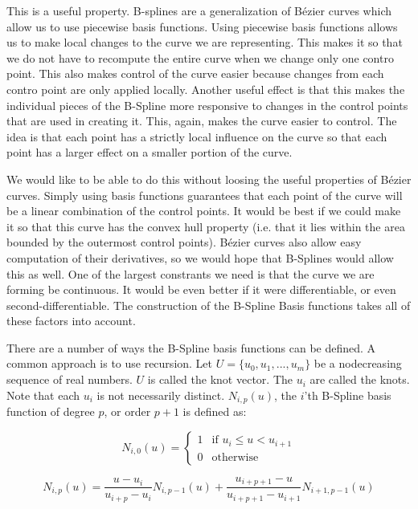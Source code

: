 This is a useful property.
B-splines are a generalization of B\'{e}zier curves which allow us to use piecewise basis functions.
Using piecewise basis functions allows us to make local changes to the curve we are representing.
This makes it so that we do not have to recompute the entire curve when we change only one contro point.
This also makes control of the curve easier because changes from each contro point are only applied locally.
Another useful effect is that this makes the individual pieces of the B-Spline more responsive to changes in the control points that are used in creating it.
This, again, makes the curve easier to control.
The idea is that each point has a strictly local influence on the curve so that each point has a larger effect on a smaller portion of the curve.

We would like to be able to do this without loosing the useful properties of B\'{e}zier curves.
Simply using basis functions guarantees that each point of the curve will be a linear combination of the control points.
It would be best if we could make it so that this curve has the convex hull property (i.e. that it lies within the area bounded by the outermost control points).
B\'{e}zier curves also allow easy computation of their derivatives, so we would hope that B-Splines would allow this as well.
One of the largest constrants we need is that the curve we are forming be continuous.
It would be even better if it were differentiable, or even second-differentiable.
The construction of the B-Spline Basis functions takes all of these factors into account.

There are a number of ways the B-Spline basis functions can be defined.
A common approach is to use recursion.
Let $U = \lbrace u_0, u_1, ... , u_m \rbrace$ be a nodecreasing sequence of real numbers.
$U$ is called the knot vector.
The $u_i$ are called the knots.
Note that each $u_i$ is not necessarily distinct.
$N_{i,p}(u)$, the $i$'th B-Spline basis function of degree $p$, or order $p+1$ is defined as:

\begin{equation}
N_{i,0}(u) = 
\begin{cases}
1 & \text{if } u_i \leq u < u_{i+1} \\
0 & \text{otherwise}
\end{cases}
\end{equation}

\begin{equation}
N_{i,p}(u) = \frac{u - u_i}{u_{i+p} - u_i} N_{i,p-1}(u) + \frac{u_{i + p + 1} - u}{u_{i + p + 1} - u_{i + 1}} N_{i+1,p-1}(u)
\end{equation}

